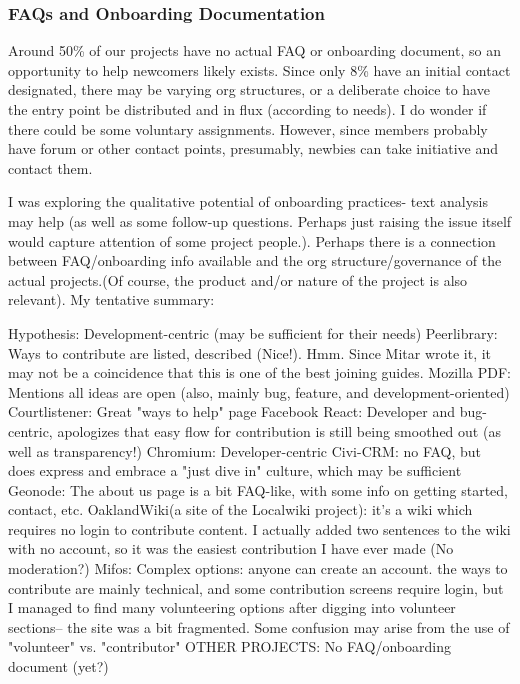 \subsubsection{FAQs and Onboarding Documentation}

Around 50\% of our projects have no actual FAQ or onboarding document, so an opportunity to help newcomers likely exists. Since only 8\% have an initial contact designated, there may be varying org structures, or a deliberate choice to have the entry point be distributed and in flux (according to needs). I do wonder if there could be some voluntary assignments. However, since members probably have forum or other contact points, presumably, newbies can take initiative and contact them.

I was exploring the qualitative potential of onboarding practices- text analysis may help (as well as some follow-up questions. Perhaps just raising the issue itself would capture attention of some project people.). Perhaps there is a connection between FAQ/onboarding info available and the org structure/governance of the actual projects.(Of course, the product and/or nature of the project is also relevant). My tentative summary:

Hypothesis: Development-centric (may be sufficient for their needs)
Peerlibrary: Ways to contribute are listed, described (Nice!). Hmm. Since Mitar wrote it, it may not be a coincidence that this is one of the best joining guides.
Mozilla PDF: Mentions all ideas are open (also, mainly bug, feature, and development-oriented)
Courtlistener: Great "ways to help" page
Facebook React: Developer and bug-centric, apologizes that easy flow for contribution is still being smoothed out (as well as transparency!)
Chromium: Developer-centric
Civi-CRM: no FAQ, but does express and embrace a  "just dive in" culture, which may be sufficient
Geonode: The about us page is a bit FAQ-like, with some info on getting started, contact, etc.
OaklandWiki(a site of the Localwiki project): it's a wiki which requires no login to contribute content. I actually added two sentences to the wiki with no account, so it was the easiest contribution I have ever made (No moderation?)
Mifos: Complex options: anyone can create an account. the ways to contribute are mainly technical, and some contribution screens require login, but I managed to find many volunteering options after digging into volunteer sections-- the site was a bit fragmented. Some confusion may arise from the use of "volunteer" vs. "contributor"
OTHER PROJECTS: No FAQ/onboarding document (yet?)




